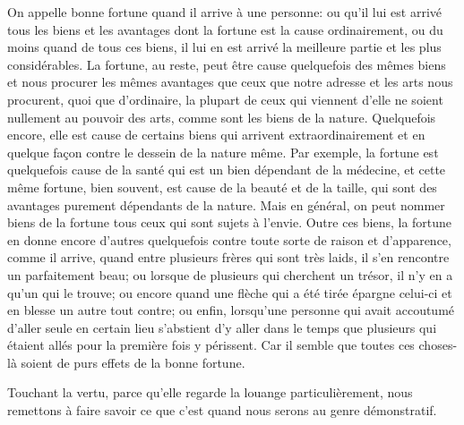 On appelle bonne fortune quand il arrive à une personne: ou qu'il lui est arrivé tous les biens et les avantages dont la
fortune est la cause ordinairement, ou du moins quand de tous ces biens, il lui en est arrivé la meilleure partie et les
plus considérables. La fortune, au reste, peut être cause quelquefois des mêmes biens et nous procurer les mêmes avantages
que ceux que notre adresse et les arts nous procurent, quoi que d'ordinaire, la plupart de ceux qui viennent d'elle ne
soient nullement au pouvoir des arts, comme sont les biens de la nature. Quelquefois encore, elle est cause de certains
biens qui arrivent extraordinairement et en quelque façon contre le dessein de la nature même. Par exemple, la fortune est
quelquefois cause de la santé qui est un bien dépendant de la médecine, et cette même fortune, bien souvent, est cause de
la beauté et de la taille, qui sont des avantages purement dépendants de la nature. Mais en général, on peut nommer biens
de la fortune tous ceux qui sont sujets à l'envie. Outre ces biens, la fortune en donne encore d'autres quelquefois contre
toute sorte de raison et d'apparence, comme il arrive, quand entre plusieurs frères qui sont très laids, il s'en rencontre
un parfaitement beau; ou lorsque de plusieurs qui cherchent un trésor, il n'y en a qu'un qui le trouve; ou encore quand
une flèche qui a été tirée épargne celui-ci et en blesse un autre tout contre; ou enfin, lorsqu'une personne qui avait
accoutumé d'aller seule en certain lieu s'abstient d'y aller dans le temps que plusieurs qui étaient allés pour la première
fois y périssent. Car il semble que toutes ces choses-là soient de purs effets de la bonne fortune.

\bigbreak

Touchant la vertu, parce qu'elle regarde la louange particulièrement, nous remettons à faire savoir ce que c'est quand nous serons au genre démonstratif.
